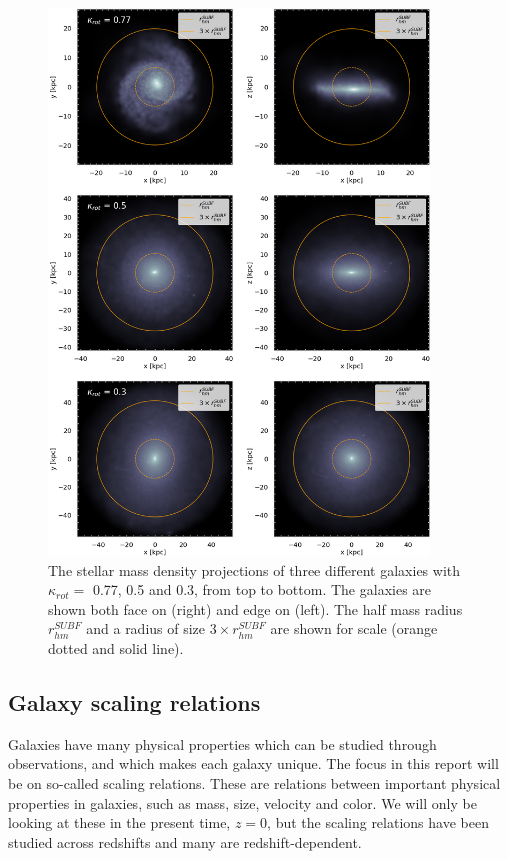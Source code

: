 \begin{figure}
    \centering
    \includegraphics[width=0.9\textwidth]{images/kappa_rot.png}
    \caption{The stellar mass density projections of three different galaxies with $\kappa_{rot} =$ 0.77, 0.5 and 0.3, from top to bottom. The galaxies are shown both face on (right) and edge on (left). The half mass radius $r^{SUBF}_{hm}$ and a radius of size $3 \times r^{SUBF}_{hm}$ are shown for scale (orange dotted and solid line). }
    \label{kappa_rot}
\end{figure}

\subsection{Galaxy scaling relations}
Galaxies have many physical properties which can be studied through observations, and which makes each galaxy unique. The focus in this report will be on so-called scaling relations. These are relations between important physical properties in galaxies, such as mass, size, velocity and color. We will only be looking at these in the present time, $z=0$, but the scaling relations have been studied across redshifts and many are redshift-dependent.

